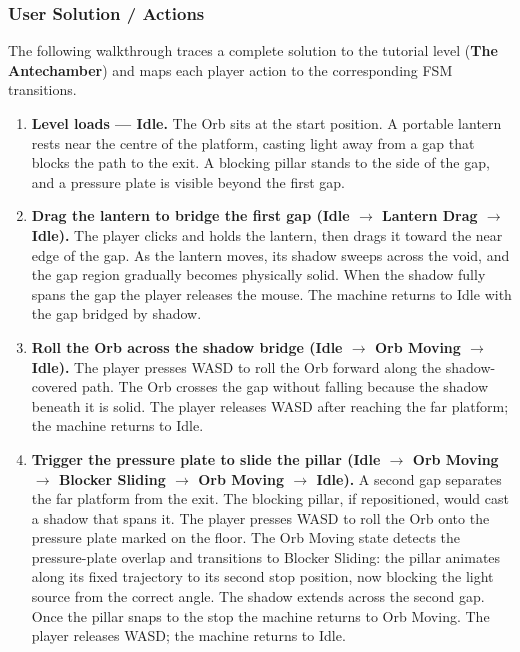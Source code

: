 \documentclass[11pt, letterpaper]{article}
\begin{document}
        \subsubsection{User Solution / Actions}

        The following walkthrough traces a complete solution to the tutorial
        level (\textbf{The Antechamber}) and maps each player action to the
        corresponding FSM transitions.

        \begin{enumerate}[leftmargin=1.5em, itemsep=4pt]

            \item \textbf{Level loads --- Idle.}
                  The Orb sits at the start position. A portable lantern rests
                  near the centre of the platform, casting light away from a
                  gap that blocks the path to the exit. A blocking pillar
                  stands to the side of the gap, and a pressure plate is
                  visible beyond the first gap.

            \item \textbf{Drag the lantern to bridge the first gap
                  (Idle $\to$ Lantern Drag $\to$ Idle).}
                  The player clicks and holds the lantern, then drags it
                  toward the near edge of the gap. As the lantern moves, its
                  shadow sweeps across the void, and the gap region gradually
                  becomes physically solid. When the shadow fully spans the
                  gap the player releases the mouse. The machine returns to
                  Idle with the gap bridged by shadow.

            \item \textbf{Roll the Orb across the shadow bridge
                  (Idle $\to$ Orb Moving $\to$ Idle).}
                  The player presses WASD to roll the Orb forward along the
                  shadow-covered path. The Orb crosses the gap without falling
                  because the shadow beneath it is solid. The player releases
                  WASD after reaching the far platform; the machine returns to
                  Idle.

            \item \textbf{Trigger the pressure plate to slide the pillar
                  (Idle $\to$ Orb Moving $\to$ Blocker Sliding $\to$
                  Orb Moving $\to$ Idle).}
                  A second gap separates the far platform from the exit. The
                  blocking pillar, if repositioned, would cast a shadow that
                  spans it. The player presses WASD to roll the Orb onto the
                  pressure plate marked on the floor. The Orb Moving state
                  detects the pressure-plate overlap and transitions to Blocker
                  Sliding: the pillar animates along its fixed trajectory to
                  its second stop position, now blocking the light source from
                  the correct angle. The shadow extends across the second gap.
                  Once the pillar snaps to the stop the machine returns to Orb
                  Moving. The player releases WASD; the machine returns to
                  Idle.


\end{enumerate}
\end{document}
